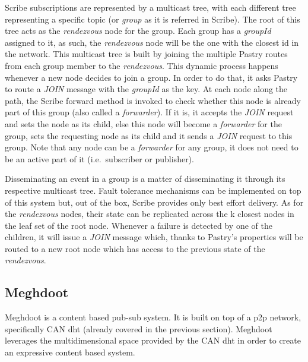 Scribe subscriptions are represented by a multicast tree, with each
different tree representing a specific topic (or \emph{group} as it is
referred in Scribe). The root of this tree acts as the \emph{rendezvous}
node for the group. Each group has a \emph{groupId} assigned to it, as
such, the \emph{rendezvous} node will be the one with the closest \acrshort{id} in
the network. This multicast tree is built by joining the multiple Pastry
routes from each group member to the \emph{rendezvous}. This dynamic
process happens whenever a new node decides to join a group. In order to
do that, it asks Pastry to route a \emph{JOIN} message with the
\emph{groupId} as the key. At each node along the path, the Scribe
forward method is invoked to check whether this node is already part of this
group (also called a \emph{forwarder}). If it is, it accepts the
\emph{JOIN} request and sets the node as its child, else this node will
become a \emph{forwarder} for the group, sets the requesting node as its
child and it sends a \emph{JOIN} request to this group. Note that any
node can be a \emph{forwarder} for any group, it does not need to be an active
part of it (i.e.~subscriber or publisher).

Disseminating an event in a group is a matter of disseminating it
through its respective multicast tree. Fault tolerance mechanisms can be
implemented on top of this system but, out of the box, Scribe provides
only best effort delivery. As for the \emph{rendezvous} nodes, their
state can be replicated across the k closest nodes in the leaf set of
the root node. Whenever a failure is detected by one of the children, it will
issue a \emph{JOIN} message which, thanks to Pastry's properties will be
routed to a new root node which has access to the previous state of the
\emph{rendezvous}.

\subsection{Meghdoot}\label{meghdoot}

Meghdoot \cite{Gupta2004} is a content based pub-sub system.
It is built on top of a \acrshort{p2p} network, specifically CAN \acrshort{dht} (already
covered in the previous section). Meghdoot leverages the
multidimensional space provided by the CAN \acrshort{dht} in order to create an
expressive content based system.

